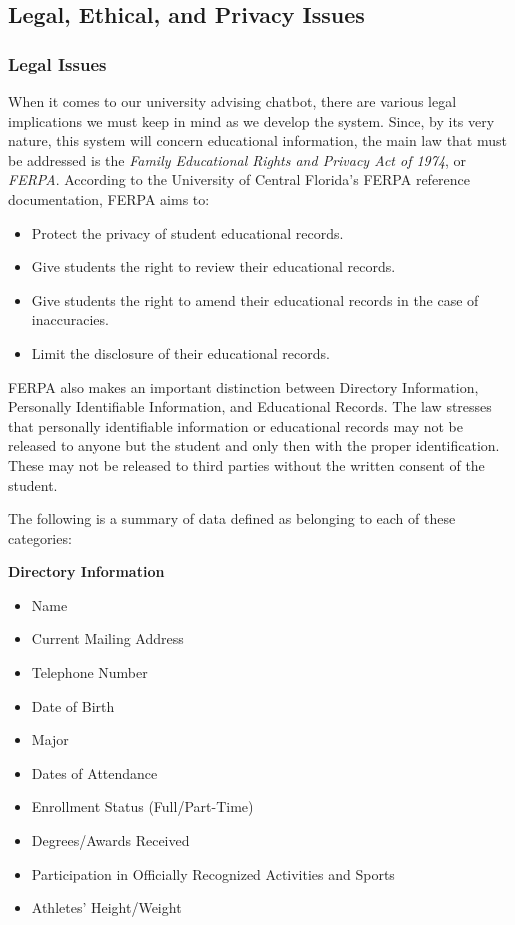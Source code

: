 \documentclass[titlepage, 12pt]{article}
\begin{document}
\subsection{Legal, Ethical, and Privacy Issues}

\subsubsection{Legal Issues}

When it comes to our university advising chatbot, there are various legal implications we must keep in mind as we develop the system. Since, by its very nature, this system will concern educational information, the main law that must be addressed is the \emph{Family Educational Rights and Privacy Act of 1974}, or \emph{FERPA}. According to the University of Central Florida’s FERPA reference documentation, FERPA aims to:

\begin{itemize}

    \item Protect the privacy of student educational records.
    \item Give students the right to review their educational records.
    \item Give students the right to amend their educational records in the case of inaccuracies.
    \item Limit the disclosure of their educational records.

\end{itemize}

FERPA also makes an important distinction between Directory Information, Personally Identifiable Information, and Educational Records. The law stresses that personally identifiable information or educational records may not be released to anyone but the student and only then with the proper identification. These may not be released to third parties without the written consent of the student.

The following is a summary of data defined as belonging to each of these categories:

\textbf{Directory Information}
\begin{itemize}
    \item Name
    \item Current Mailing Address
    \item Telephone Number
    \item Date of Birth
    \item Major
    \item Dates of Attendance
    \item Enrollment Status (Full/Part-Time)
    \item Degrees/Awards Received
    \item Participation in Officially Recognized Activities and Sports
    \item Athletes’ Height/Weight
\end{itemize}
\end{document}
